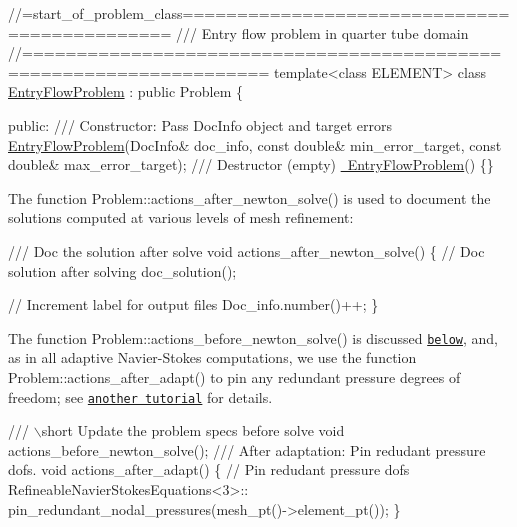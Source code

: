  
\begin{DoxyCodeInclude}
\textcolor{comment}{//=start\_of\_problem\_class=============================================}
\textcolor{comment}{/// Entry flow problem in quarter tube domain}
\textcolor{comment}{}\textcolor{comment}{//====================================================================}
\textcolor{keyword}{template}<\textcolor{keyword}{class} ELEMENT>
\textcolor{keyword}{class }\hyperlink{classEntryFlowProblem}{EntryFlowProblem} : \textcolor{keyword}{public} Problem
\{

\textcolor{keyword}{public}:
\textcolor{comment}{}
\textcolor{comment}{ /// Constructor: Pass DocInfo object and target errors}
\textcolor{comment}{} \hyperlink{classEntryFlowProblem_a0d527811321d270d769224dcbac8d240}{EntryFlowProblem}(DocInfo& doc\_info, \textcolor{keyword}{const} \textcolor{keywordtype}{double}& min\_error\_target,
                  \textcolor{keyword}{const} \textcolor{keywordtype}{double}& max\_error\_target);
\textcolor{comment}{}
\textcolor{comment}{ /// Destructor (empty)}
\textcolor{comment}{} \hyperlink{classEntryFlowProblem_a22d76abde64459f167067c1d2cb5c1e2}{~EntryFlowProblem}() \{\}

\end{DoxyCodeInclude}


The function {\ttfamily Problem\+::actions\+\_\+after\+\_\+newton\+\_\+solve()} is used to document the solutions computed at various levels of mesh refinement\+:


\begin{DoxyCodeInclude}
\textcolor{comment}{}
\textcolor{comment}{ /// Doc the solution after solve}
\textcolor{comment}{} \textcolor{keywordtype}{void} actions\_after\_newton\_solve() 
  \{
   \textcolor{comment}{// Doc solution after solving}
   doc\_solution();

   \textcolor{comment}{// Increment label for output files}
   Doc\_info.number()++;
  \}

\end{DoxyCodeInclude}


The function {\ttfamily Problem\+::actions\+\_\+before\+\_\+newton\+\_\+solve()} is discussed \href{#before_solve}{\tt below}, and, as in all adaptive Navier-\/\+Stokes computations, we use the function {\ttfamily Problem\+::actions\+\_\+after\+\_\+adapt()} to pin any redundant pressure degrees of freedom; see \href{../../../navier_stokes/adaptive_driven_cavity/html/index.html}{\tt another tutorial} for details.


\begin{DoxyCodeInclude}
\textcolor{comment}{}
\textcolor{comment}{ /// \(\backslash\)short Update the problem specs before solve }
\textcolor{comment}{} \textcolor{keywordtype}{void} actions\_before\_newton\_solve();
\textcolor{comment}{}
\textcolor{comment}{ /// After adaptation: Pin redudant pressure dofs.}
\textcolor{comment}{} \textcolor{keywordtype}{void} actions\_after\_adapt()
  \{
   \textcolor{comment}{// Pin redudant pressure dofs}
   RefineableNavierStokesEquations<3>::
    pin\_redundant\_nodal\_pressures(mesh\_pt()->element\_pt());
  \} 

\end{DoxyCodeInclude}


